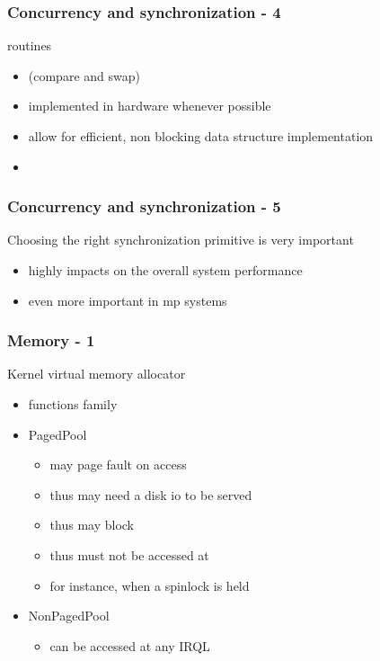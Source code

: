 
\begin{frame}
 \frametitle{Concurrency and synchronization - 4}

  routines

 \begin{itemize}
  \item {} (compare and swap)
  \item implemented in hardware whenever possible
  \item allow for efficient, non blocking data structure implementation
  \item {}
 \end{itemize}

\end{frame}


\begin{frame}
 \frametitle{Concurrency and synchronization - 5}

 Choosing the right synchronization primitive is very important

 \begin{itemize}
  \item highly impacts on the overall system performance
  \item even more important in mp systems
 \end{itemize}

\end{frame}


\begin{frame}
 \frametitle{Memory - 1}

 Kernel virtual memory allocator

 \begin{itemize}
  \item {} functions family

  \item PagedPool
  \begin{itemize}
   \item may page fault on access
   \item thus may need a disk io to be served
   \item thus may block
   \item thus must not be accessed at 
   \item for instance, when a spinlock is held
  \end{itemize}

  \item NonPagedPool
  \begin{itemize}
   \item can be accessed at any IRQL
  \end{itemize}

 \end{itemize}

\end{frame}

